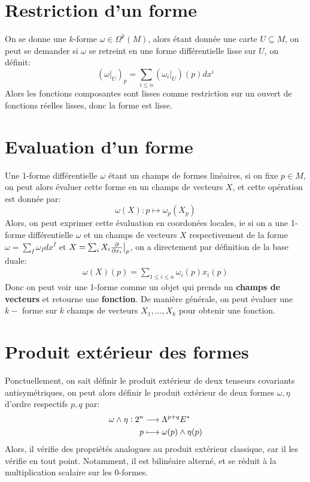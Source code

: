    \section{Restriction d'un forme}
      On se donne une \(k\)-forme \( \omega \in \Omega^k(M) \), alors étant donnée une carte \( U \subseteq M \), on peut se demander si \( \omega \) se retreint en une forme différentielle lisse sur \( U \), on définit:
      \[ 
         (\omega|_U)_p = \sum_{i \leq n} (\omega_i|_U)(p)dx^i 
      \]
      Alors les fonctions composantes sont lisses comme restriction sur un ouvert de fonctions réelles lisses, donc la forme est lisse.   
   \section{Evaluation d'un forme}
      Une 1-forme différentielle \( \omega \) étant un champs de formes linéaires, si on fixe \( p \in M \), on peut alors évaluer cette forme en un champs de vecteurs \( X \), et cette opération est donnée par:
      \[ 
         \omega(X) : p \longmapsto \omega_p(X_p)
      \]
      Alors, on peut exprimer cette évaluation en coordonées locales, ie si on a une 1-forme différentielle \( \omega \) et un champs de vecteurs \( X \) respectivement de la forme \( \omega = \sum_I \omega_I dx^I \) et \( X = \sum_i X_i \frac{\partial }{\partial x_i}\big|_p\), on a directement par définition de la base duale:
      \begin{align*}
         \omega(X)(p) = \sum_{1 \leq i \leq n} \omega_{i}(p)x_i(p)
      \end{align*} 
      Donc on peut voir une 1-forme comme un objet qui prends un \textbf{champs de vecteurs} et retourne une \textbf{fonction}. De manière générale, on peut évaluer une \( k-\) forme sur \( k \) champs de vecteurs \( X_1, \ldots, X_k \) pour obtenir une fonction.
   \section{Produit extérieur des formes}
      Ponctuellement, on sait définir le produit extérieur de deux tenseurs covariants antisymétriques, on peut alors définir le produit extérieur de deux formes \( \omega, \eta \) d'ordre respectifs \( p, q \) par:
      \[ 
         \begin{aligned}
            \omega \wedge \eta : 2^n &\longrightarrow \Lambda^{p+q}E^* \\
            p &\longmapsto \omega(p) \wedge \eta(p)
         \end{aligned}
      \]
      Alors, il vérifie des propriétés analogues au produit extérieur classique, car il les vérifie en tout point. Notamment, il est bilinéaire alterné, et se réduit à la multiplication scalaire sur les 0-formes.
